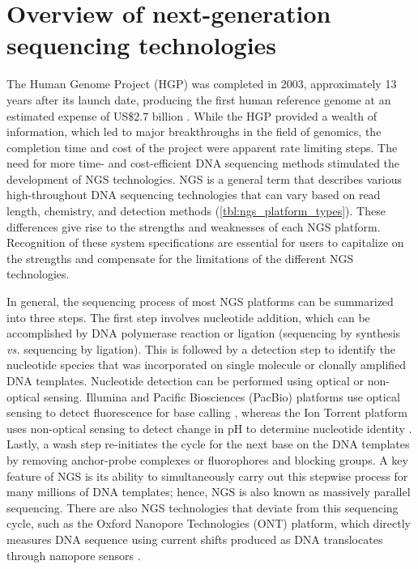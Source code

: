 \section{Overview of next-generation sequencing technologies}
\label{sec:Overviewofnext-generationsequencingtechnologies}

The Human Genome Project (\acs{HGP}) was completed in 2003, approximately 13 years after its launch date, producing the first human reference genome at an estimated expense of US\$2.7 billion \cite{NationalHumanGenomeResearchInstitute2010}. While the HGP provided a wealth of information, which led to major breakthroughs in the field of genomics, the completion time and cost of the project were apparent rate limiting steps. The need for more time- and cost-efficient DNA sequencing methods stimulated the development of NGS technologies. NGS is a general term that describes various high-throughout DNA sequencing technologies that can vary based on read length, chemistry, and detection methods (\autoref{tbl:ngs_platform_types}). These differences give rise to the strengths and weaknesses of each NGS platform. Recognition of these system specifications are essential for users to capitalize on the strengths and compensate for the limitations of the different NGS technologies.

In general, the sequencing process of most NGS platforms can be summarized into three steps. The first step involves nucleotide addition, which can be accomplished by DNA polymerase reaction or ligation (sequencing by synthesis \textit{vs.} sequencing by ligation). This is followed by a detection step to identify the nucleotide species that was incorporated on single molecule or clonally amplified DNA templates. Nucleotide detection can be performed using optical or non-optical sensing. Illumina and Pacific Biosciences (PacBio) platforms use optical sensing to detect fluorescence for base calling \cite{Bentley2008, Guo2008, Carneiro2012, English2012, Eid2009}, whereas the Ion Torrent platform uses non-optical sensing to detect change in pH to determine nucleotide identity \cite{Rothberg2011}. Lastly, a wash step re-initiates the cycle for the next base on the DNA templates by removing anchor-probe complexes or fluorophores and blocking groups. A key feature of NGS is its ability to simultaneously carry out this stepwise process for many millions of DNA templates; hence, NGS is also known as massively parallel sequencing. There are also NGS technologies that deviate from this sequencing cycle, such as the Oxford Nanopore Technologies (ONT) platform, which directly measures DNA sequence using current shifts produced as DNA translocates through nanopore sensors \cite{Wang2014}.

